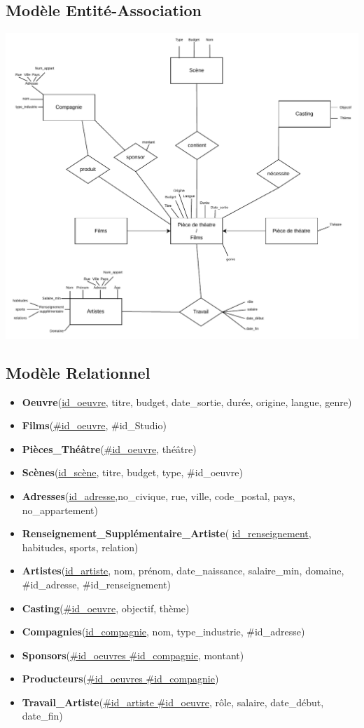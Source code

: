 \documentclass{article}
\begin{document}
\subsection{Modèle Entité-Association}
\begin{center}
  \includegraphics[scale=0.85]{../modeleEA.pdf}
\end{center}
\newpage

\subsection{Modèle Relationnel}
\begin{itemize}
\item \textbf{Oeuvre}(\underline{id\_oeuvre}, titre, budget,
  date\_sortie, durée, origine, langue, genre)
\item \textbf{Films}(\underline{\#id\_oeuvre}, \#id\_Studio)
\item \textbf{Pièces\_Théâtre}(\underline{\#id\_oeuvre}, théâtre)
\item \textbf{Scènes}(\underline{id\_scène}, titre, budget, type,
  \#id\_oeuvre)
\item \textbf{Adresses}(\underline{id\_adresse},no\_civique, rue,
  ville, code\_postal, pays, no\_appartement)
\item \textbf{Renseignement\_Supplémentaire\_Artiste}(
  \underline{id\_renseignement}, habitudes, sports, relation)
\item \textbf{Artistes}(\underline{id\_artiste}, nom, prénom,
  date\_naissance, salaire\_min, domaine, \#id\_adresse,
  \#id\_renseignement)
\item \textbf{Casting}(\underline{\#id\_oeuvre}, objectif, thème)
\item \textbf{Compagnies}(\underline{id\_compagnie}, nom,
  type\_industrie, \#id\_adresse)
\item \textbf{Sponsors}(\underline{\#id\_oeuvres \#id\_compagnie},
  montant)
\item \textbf{Producteurs}(\underline{\#id\_oeuvres
    \#id\_compagnie})
\item \textbf{Travail\_Artiste}(\underline{\#id\_artiste
    \#id\_oeuvre}, rôle, salaire, date\_début, date\_fin)
\end{itemize}
\end{document}

